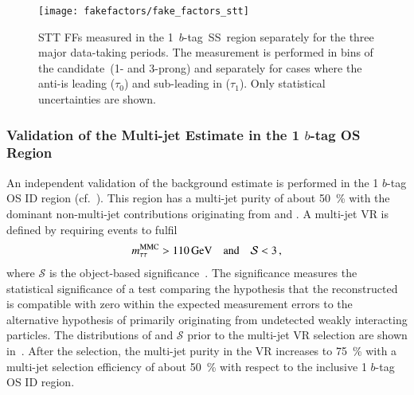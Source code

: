 

\begin{figure}[htbp]
  \centering

  \texttt{[image: fakefactors/fake\_factors\_stt]}

  \caption[FFs for events selected by STTs.]{STT FFs measured in the
    1~$b$-tag~SS~region separately for the three major data-taking periods. The
    measurement is performed in bins of the \tauhadvis candidate~\Ntracks (1-
    and 3-prong) and separately for cases where the anti-\tauhadvis is leading
    ($\tau_0$) and sub-leading in \pT ($\tau_1$). Only statistical uncertainties
    are shown.}%
  \label{fig:mjfakes_stt_ffs}
\end{figure}

\subsubsection{Validation of the Multi-jet Estimate in the 1 $b$-tag OS Region}

An independent validation of the background estimate is performed in the 1
$b$-tag OS ID region (cf.\ ). This region has a
multi-jet purity of about \SI{50}{\percent} with the dominant non-multi-jet
contributions originating from \Zjets and \ttbar. A multi-jet VR is defined by
requiring events to fulfil
\begin{align*}
  m_{\tau\tau}^\text{MMC} > \SI{110}{\ensuremath{\text{GeV}}} \quad \text{and} \quad \mathcal{S} < 3 \,\text{,}
\end{align*}
where $\mathcal{S}$ is the object-based \pTmissAbs
significance~\cite{ATLAS-CONF-2018-038}. The \pTmissAbs significance measures
the statistical significance of a test comparing the hypothesis that the
reconstructed \pTmissAbs is compatible with zero within the expected measurement
errors to the alternative hypothesis of \pTmissAbs primarily originating from
undetected weakly interacting particles. The distributions of \mMMC and
$\mathcal{S}$ prior to the multi-jet VR selection are shown
in~. After the selection, the multi-jet
purity in the VR increases to \SI{75}{\percent} with a multi-jet selection
efficiency of about \SI{50}{\percent} with respect to the inclusive 1 $b$-tag OS
ID region.

